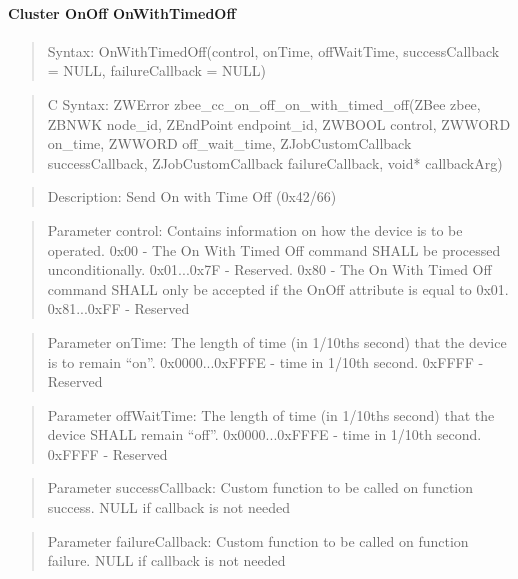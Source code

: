 \paragraph{Cluster OnOff OnWithTimedOff}
\begin{quote}Syntax: OnWithTimedOff(control, onTime, offWaitTime, successCallback = NULL, failureCallback = NULL)\end{quote}
\begin{quote}C Syntax: ZWError zbee\_cc\_on\_off\_on\_with\_timed\_off(ZBee zbee, ZBNWK node\_id, ZEndPoint endpoint\_id, ZWBOOL control, ZWWORD on\_time, ZWWORD off\_wait\_time, ZJobCustomCallback successCallback, ZJobCustomCallback failureCallback, void* callbackArg)\end{quote}
\begin{quote}Description: Send On with Time Off (0x42/66)\end{quote}
\begin{quote}Parameter control: Contains information on how the device is to be operated. 0x00        -  The On With Timed Off command SHALL be processed unconditionally. 0x01...0x7F - Reserved. 0x80        - The On With Timed Off command SHALL only be accepted if the OnOff attribute is equal to 0x01. 0x81...0xFF - Reserved\end{quote}
\begin{quote}Parameter onTime: The length of time (in 1/10ths second) that the device is to remain “on”. 0x0000...0xFFFE - time in 1/10th second. 0xFFFF          - Reserved\end{quote}
\begin{quote}Parameter offWaitTime: The length of time (in 1/10ths second) that the device SHALL remain “off”. 0x0000...0xFFFE - time in 1/10th second. 0xFFFF          - Reserved\end{quote}
\begin{quote}Parameter successCallback: Custom function to be called on function success. NULL if callback is not needed\end{quote}
\begin{quote}Parameter failureCallback: Custom function to be called on function failure. NULL if callback is not needed\end{quote}



